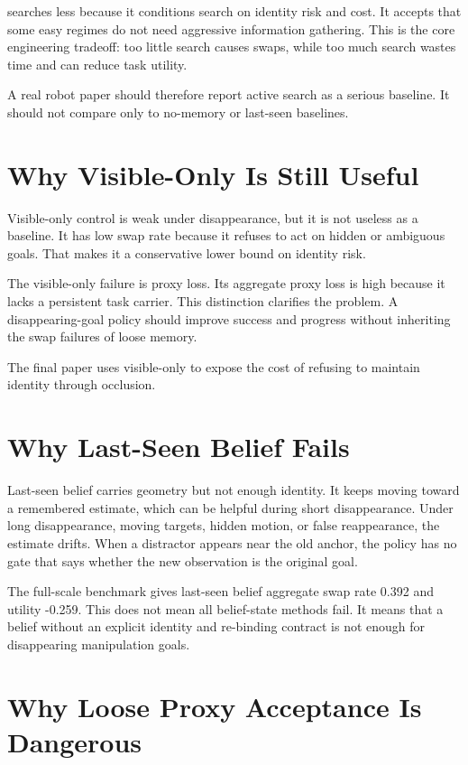 \method searches less because it conditions search on identity risk and cost. It accepts that some easy regimes do not need aggressive information gathering. This is the core engineering tradeoff: too little search causes swaps, while too much search wastes time and can reduce task utility.

A real robot paper should therefore report active search as a serious baseline. It should not compare only to no-memory or last-seen baselines.

\section{Why Visible-Only Is Still Useful}

Visible-only control is weak under disappearance, but it is not useless as a baseline. It has low swap rate because it refuses to act on hidden or ambiguous goals. That makes it a conservative lower bound on identity risk.

The visible-only failure is proxy loss. Its aggregate proxy loss is high because it lacks a persistent task carrier. This distinction clarifies the problem. A disappearing-goal policy should improve success and progress without inheriting the swap failures of loose memory.

The final paper uses visible-only to expose the cost of refusing to maintain identity through occlusion.

\section{Why Last-Seen Belief Fails}

Last-seen belief carries geometry but not enough identity. It keeps moving toward a remembered estimate, which can be helpful during short disappearance. Under long disappearance, moving targets, hidden motion, or false reappearance, the estimate drifts. When a distractor appears near the old anchor, the policy has no gate that says whether the new observation is the original goal.

The full-scale benchmark gives last-seen belief aggregate swap rate 0.392 and utility -0.259. This does not mean all belief-state methods fail. It means that a belief without an explicit identity and re-binding contract is not enough for disappearing manipulation goals.

\section{Why Loose Proxy Acceptance Is Dangerous}

